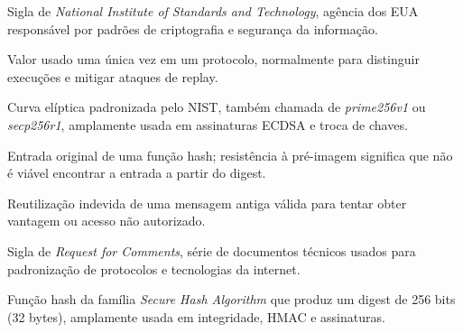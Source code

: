 \begin{description}[
  font=\normalfont\bfseries,
  style=multiline,
  leftmargin=5.6cm,
  labelwidth=4.9cm,
  labelsep=0.35cm,
  itemsep=0.55\baselineskip
]
  \item[NIST] Sigla de \textit{National Institute of Standards and Technology}, agência dos EUA responsável por padrões de criptografia e segurança da informação.
  \item[Nonce] Valor usado uma única vez em um protocolo, normalmente para distinguir execuções e mitigar ataques de replay.
  \item[P-256] Curva elíptica padronizada pelo NIST, também chamada de \textit{prime256v1} ou \textit{secp256r1}, amplamente usada em assinaturas ECDSA e troca de chaves.
  \item[Pré-imagem] Entrada original de uma função hash; resistência à pré-imagem significa que não é viável encontrar a entrada a partir do digest.
  \item[Replay] Reutilização indevida de uma mensagem antiga válida para tentar obter vantagem ou acesso não autorizado.
  \item[RFC] Sigla de \textit{Request for Comments}, série de documentos técnicos usados para padronização de protocolos e tecnologias da internet.
  \item[SHA-256] Função hash da família \textit{Secure Hash Algorithm} que produz um digest de 256 bits (32 bytes), amplamente usada em integridade, HMAC e assinaturas.
\end{description}
